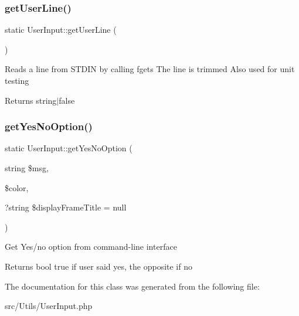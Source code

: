 \subsubsection{\texorpdfstring{get\+User\+Line()}{getUserLine()}}
{\footnotesize\ttfamily static User\+Input\+::get\+User\+Line (\begin{DoxyParamCaption}{ }\end{DoxyParamCaption})\hspace{0.3cm}{\ttfamily [static]}}

Reads a line from S\+T\+D\+IN by calling {\ttfamily fgets} The line is trimmed Also used for unit testing \begin{DoxyReturn}{Returns}
string$\vert$false 
\end{DoxyReturn}
\mbox{\label{classUserInput_a5282771aa3460edbc1b5b65aaeaccaca}} 
\subsubsection{\texorpdfstring{get\+Yes\+No\+Option()}{getYesNoOption()}}
{\footnotesize\ttfamily static User\+Input\+::get\+Yes\+No\+Option (\begin{DoxyParamCaption}\item[{string}]{\$msg,  }\item[{}]{\$color,  }\item[{?string}]{\$display\+Frame\+Title = {\ttfamily null} }\end{DoxyParamCaption})\hspace{0.3cm}{\ttfamily [static]}}

Get Yes/no option from command-\/line interface \begin{DoxyReturn}{Returns}
bool true if user said yes, the opposite if no 
\end{DoxyReturn}


The documentation for this class was generated from the following file\+:\begin{DoxyCompactItemize}
\item 
src/\+Utils/User\+Input.\+php\end{DoxyCompactItemize}
